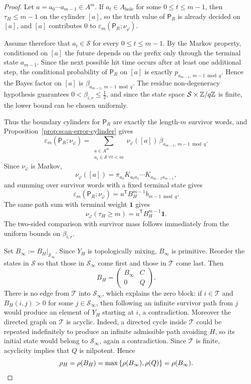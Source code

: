 \begin{proof}
Let \(a=a_0\cdots a_{m-1}\in A^m\).  If \(a_t\in A_{\mathrm{hole}}\) for some
\(0\leq t\leq m-1\), then \(\tau_H\leq m-1\) on the cylinder \([a]\), so
the truth value of \(\mathsf{P}_R\) is already decided on \([a]\), and
\([a]\) contributes \(0\) to
\(\varepsilon_m(\mathsf{P}_R;\nu_\varphi)\).

Assume therefore that \(a_t\in\mathcal S\) for every
\(0\leq t\leq m-1\).  By the Markov property, conditioned on \([a]\) the
future depends on the prefix only through the terminal state
\(a_{m-1}\).  Since the next possible hit time occurs after at least one
additional step, the conditional probability of \(\mathsf{P}_R\) on
\([a]\) is exactly \(p_{a_{m-1},\,m-1\bmod q}\).  Hence the Bayes factor
on \([a]\) is \(\beta_{a_{m-1},\,m-1\bmod q}\).  The residue
non-degeneracy hypothesis guarantees \(0<\beta_{i,r}\leq \tfrac12\), and
since the state space \(\mathcal S\times \mathbb{Z}/q\mathbb{Z}\) is finite, the lower
bound can be chosen uniformly.

Thus the boundary cylinders for \(\mathsf{P}_R\) are exactly the
length-\(m\) survivor words, and
Proposition~\ref{prop:scan-error-cylinder} gives
\[
  \varepsilon_m(\mathsf{P}_R;\nu_\varphi)
  = \sum_{\substack{a\in A^m\\ a_t\in\mathcal S\ \forall t<m}}
      \nu_\varphi([a])\,
      \beta_{a_{m-1},\,m-1\bmod q}.
\]
Since \(\nu_\varphi\) is Markov,
\[
  \nu_\varphi([a])
  = \pi_{a_0}K_{a_0a_1}\cdots K_{a_{m-2}a_{m-1}},
\]
and summing over survivor words with a fixed terminal state gives
\[
  \varepsilon_m(\mathsf{P}_R;\nu_\varphi)
  = u^{\mathsf T}B_H^{m-1}b_{m-1\bmod q}.
\]
The same path sum with terminal weight \(\mathbf{1}\) gives
\[
  \nu_\varphi(\tau_H\geq m)
  = u^{\mathsf T}B_H^{m-1}\mathbf{1}.
\]
The two-sided comparison with survivor mass follows immediately from the
uniform bounds on \(\beta_{i,r}\).

Set \(B_\infty:=B_H|_{\mathcal S_\infty}\).  Since \(Y_H\) is
topologically mixing, \(B_\infty\) is primitive.  Reorder the states in
\(\mathcal S\) so that those in \(\mathcal S_\infty\) come first and
those in \(\mathcal T\) come last.  Then
\[
  B_H=
  \begin{pmatrix}
    B_\infty & C\\
    0 & Q
  \end{pmatrix}.
\]
There is no edge from \(\mathcal T\) into \(\mathcal S_\infty\), which
explains the zero block: if \(i\in\mathcal T\) and \(B_H(i,j)>0\) for
some \(j\in\mathcal S_\infty\), then following an infinite survivor path
from \(j\) would produce an element of \(Y_H\) starting at \(i\), a
contradiction.  Moreover the directed graph on \(\mathcal T\) is
acyclic.  Indeed, a directed cycle inside \(\mathcal T\) could be
repeated indefinitely to produce an infinite admissible path avoiding
\(H\), so its initial state would belong to \(\mathcal S_\infty\), again
a contradiction.  Since \(\mathcal T\) is finite, acyclicity implies
that \(Q\) is nilpotent.  Hence
\[
  \rho_H=\rho(B_H)=\max\left\{\rho(B_\infty),\rho(Q)\right\}=\rho(B_\infty).
\]


\end{proof}
